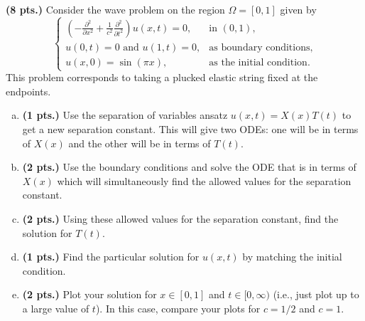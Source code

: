 \documentclass[12pt]{article} %
\begin{document}
\begin{problem}
    \textbf{(8 pts.)} Consider the wave problem on the region $\Omega=[0,1]$ given by
    \[
    \begin{cases}
    \left( - \frac{\partial^2}{\partial x^2} +\frac{1}{c^2} \frac{\partial^2}{\partial t^2} \right) u(x,t) =0, & \textrm{in $(0,1)$},\\
    u(0,t)=0 \textrm{~and~} u(1,t)=0, &\textrm{as boundary conditions},\\
    u(x,0)=\sin(\pi x), &\textrm{as the initial condition}.
    \end{cases}
    \]
    This problem corresponds to taking a plucked elastic string fixed at the endpoints.
    \begin{enumerate}[(a)]
        \item \textbf{(1 pts.)} Use the separation of variables ansatz $u(x,t)=X(x)T(t)$ to get a new separation constant. This will give two ODEs: one will be in terms of $X(x)$ and the other will be in terms of $T(t)$.
        \item \textbf{(2 pts.)} Use the boundary conditions and solve the ODE that is in terms of $X(x)$ which will simultaneously find the allowed values for the separation constant.
        \item \textbf{(2 pts.)} Using these allowed values for the separation constant, find the solution for $T(t)$.
        \item \textbf{(1 pts.)} Find the particular solution for $u(x,t)$ by matching the initial condition.
        \item \textbf{(2 pts.)} Plot your solution for $x\in [0,1]$ and $t\in [0,\infty)$ (i.e., just plot up to a large value of $t$). In this case, compare your plots for $c=1/2$ and $c=1$.
    \end{enumerate}
\end{problem}
\end{document}
